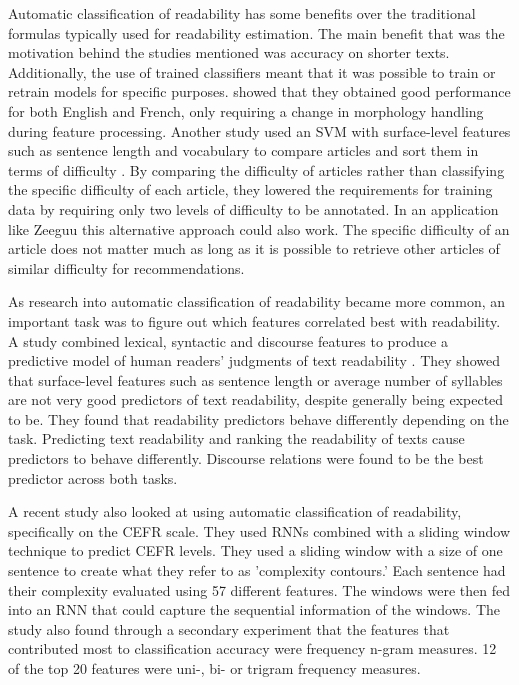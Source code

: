 \documentclass[11pt,a4paper]{article}
\begin{document}
Automatic classification of readability has some benefits over the traditional
formulas typically used for readability estimation. The main benefit that was the
motivation behind the studies mentioned was accuracy on shorter texts. Additionally,
the use of trained classifiers meant that it was possible to train
or retrain models for specific purposes.
\parencite{collins-thompson-callan-2004-language} showed that they obtained good
performance for both English and French, only requiring a change in morphology
handling during feature processing. Another study used an SVM with surface-level
features such as sentence length and vocabulary to compare articles and sort them
in terms of difficulty \parencite{10.1162/coli.09-036-R2-08-050}. By comparing the
difficulty of articles rather than classifying the specific difficulty of each article, they
lowered the requirements for training data by requiring only two levels of difficulty to be
annotated. In an application like Zeeguu this alternative approach could also work. The specific
difficulty of an article does not matter much as long as it is possible to retrieve other articles of
similar difficulty for recommendations.

As research into automatic classification of readability became more common, an important task
was to figure out which features correlated best with readability. A study combined lexical, syntactic and discourse
features to produce a predictive model of human readers' judgments of text readability \parencite{pitler-nenkova-2008-revisiting}.
They showed that surface-level features such as sentence length or average number of syllables are not very good predictors
of text readability, despite generally being expected to be. They found that readability predictors
behave differently depending on the task. Predicting text readability and ranking the readability of texts
cause predictors to behave differently. Discourse relations were found to be the best predictor across both tasks.

A recent study \parencite{kerz-etal-2021-automated} also looked at using automatic classification of readability, specifically on the CEFR scale.
They used RNNs combined with a sliding window technique to predict CEFR levels. They used a sliding window
with a size of one sentence to create what they refer to as 'complexity contours.' Each sentence
had their complexity evaluated using 57 different features. The windows were then fed into an RNN that could
capture the sequential information of the windows. The study also found through a secondary experiment that the
features that contributed most to classification accuracy were frequency n-gram measures. 12 of the top 20 features
were uni-, bi- or trigram frequency measures.
\end{document}

